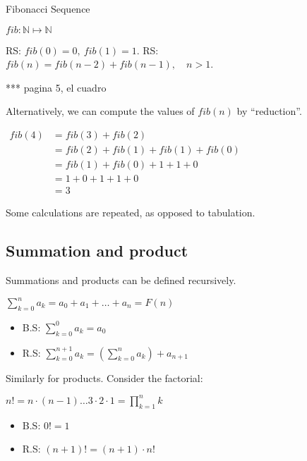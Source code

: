 \documentclass[12pt, a4paper]{book}
\begin{document}
\begin{exmp}
    Fibonacci Sequence

    $fib: \mathbb{N} \mapsto \mathbb{N}$
    
    RS: $fib(0) = 0,\ fib(1) = 1 $.\newline 
    RS: $fib(n) = fib(n-2) + fib(n-1),\quad n>1$.

    *** pagina 5, el cuadro

    Alternatively, we can compute the values of $fib(n)$ by ``reduction''.

    $
    \begin{aligned}
        fib(4) &= fib(3) + fib(2) \\
        &= fib(2) + fib(1) + fib(1) + fib(0) \\
        &= fib(1) + fib(0) + 1 + 1 + 0 \\
        &= 1 + 0 + 1 + 1+ 0 \\
        &= 3
    \end{aligned}
    $

    Some calculations are repeated, as opposed to tabulation.
\end{exmp}

\subsection{Summation and product}

Summations and products can be defined recursively.

$\sum_{k = 0}^{n} a_k = a_0 + a_1 + \ldots + a_n = F(n)$

\begin{itemize}
    \item B.S: $\sum_{k = 0}^0 a_k = a_0$
    \item R.S: $\sum_{k = 0}^{n+1} a_k = (\sum_{k = 0}^n a_k) + a_{n+1}$
\end{itemize}

Similarly for products. Consider the factorial:

$n! = n\cdot(n-1) \ldots 3\cdot 2\cdot 1 = \prod_{k = 1}^n k$

\begin{itemize}
    \item B.S: $0! = 1$
    \item R.S: $(n+1)! = (n+1)\cdot n!$
\end{itemize}
\end{document}
